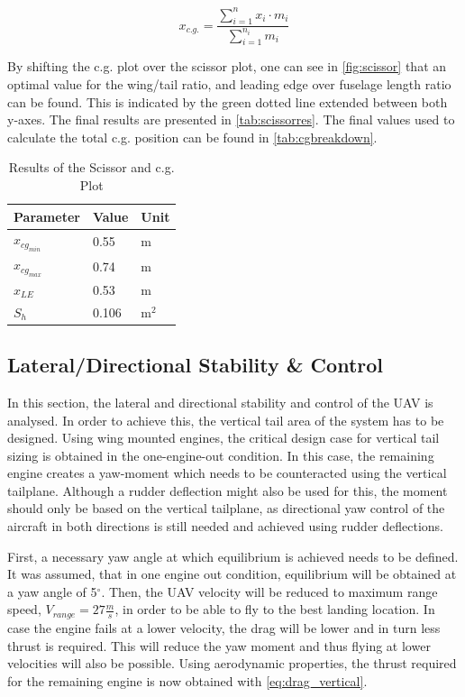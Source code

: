 \begin{equation}
\label{eq:c.g.r}
    x_{c.g.} = \frac{\sum_{i=1}^{n} {x_i\cdot m_i}}{\sum_{i=1}^{n_i} {m_i}}
\end{equation}

By shifting the c.g. plot over the scissor plot, one can see in \autoref{fig:scissor} that an optimal value for the wing/tail ratio, and leading edge over fuselage length ratio can be found. This is indicated by the green dotted line extended between both y-axes. The final results are presented in \autoref{tab:scissorres}. The final values used to calculate the total c.g. position can be found in \autoref{tab:cgbreakdown}.

\begin{table}[htb]
\centering
\caption{Results of the Scissor and c.g. Plot}
\label{tab:scissorres}
\begin{tabular}{lll}
\toprule
\textbf{Parameter} & \textbf{Value} & \textbf{Unit} \\ \midrule
$x_{cg_{min}}$     & 0.55           & m             \\ \hdashline
$x_{cg_{max}}$     & 0.74           & m             \\ \hdashline
$x_{LE}$           & 0.53           & m             \\ \hdashline
$S_h$              & 0.106          & m$^2$      \\  \bottomrule
\end{tabular}
\end{table}

\subsection{Lateral/Directional Stability \& Control}

In this section, the lateral and directional stability and control of the UAV is analysed. In order to achieve this, the vertical tail area of the system has to be designed. Using wing mounted engines, the critical design case for vertical tail sizing is obtained in the one-engine-out condition. In this case, the remaining engine creates a yaw-moment which needs to be counteracted using the vertical tailplane. Although a rudder deflection might also be used for this, the moment should only be based on the vertical tailplane, as directional yaw control of the aircraft in both directions is still needed and achieved using rudder deflections.

First, a necessary yaw angle at which equilibrium is achieved needs to be defined. It was assumed, that in one engine out condition, equilibrium will be obtained at a yaw angle of 5$^\circ$. Then, the UAV velocity will be reduced to maximum range speed, $V_{range} = 27 \frac{m}{s}$, in order to be able to fly to the best landing location. In case the engine fails at a lower velocity, the drag will be lower and in turn less thrust is required. This will reduce the yaw moment and thus flying at lower velocities will also be possible. Using aerodynamic properties, the thrust required for the remaining engine is now obtained with \autoref{eq:drag_vertical}. 

